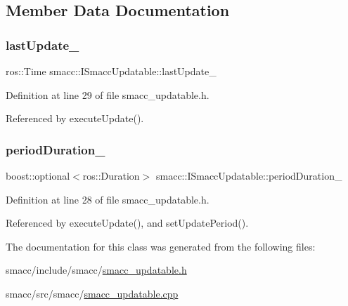 \subsection{Member Data Documentation}
\mbox{\label{classsmacc_1_1ISmaccUpdatable_ad58f7e1cd26d3fe8c3a3fccecc57feac}} 
\subsubsection{\texorpdfstring{last\+Update\+\_\+}{lastUpdate\_}}
{\footnotesize\ttfamily ros\+::\+Time smacc\+::\+I\+Smacc\+Updatable\+::last\+Update\+\_\+\hspace{0.3cm}{\ttfamily [private]}}



Definition at line 29 of file smacc\+\_\+updatable.\+h.



Referenced by execute\+Update().

\mbox{\label{classsmacc_1_1ISmaccUpdatable_ad02d9798ac5609f3ecb9fb8a46febc18}} 
\subsubsection{\texorpdfstring{period\+Duration\+\_\+}{periodDuration\_}}
{\footnotesize\ttfamily boost\+::optional$<$ros\+::\+Duration$>$ smacc\+::\+I\+Smacc\+Updatable\+::period\+Duration\+\_\+\hspace{0.3cm}{\ttfamily [private]}}



Definition at line 28 of file smacc\+\_\+updatable.\+h.



Referenced by execute\+Update(), and set\+Update\+Period().



The documentation for this class was generated from the following files\+:\begin{DoxyCompactItemize}
\item 
smacc/include/smacc/\hyperlink{smacc__updatable_8h}{smacc\+\_\+updatable.\+h}\item 
smacc/src/smacc/\hyperlink{smacc__updatable_8cpp}{smacc\+\_\+updatable.\+cpp}\end{DoxyCompactItemize}
